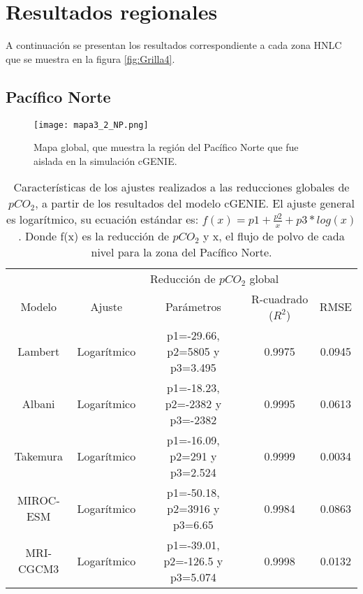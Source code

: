 \section{Resultados regionales}
A continuaci\'on se presentan los resultados correspondiente a cada zona HNLC que se muestra en la figura \ref{fig:Grilla4}.

\subsection{Pac\'ifico Norte}

\begin{figure}[H]
\centering
 \texttt{[image: mapa3\_2\_NP.png]}
 \caption[Figura región del Pacífico Norte]{Mapa global, que muestra la región del Pacífico Norte que fue aislada en la simulación cGENIE.}
  \label{fig:Mapa_NP}
\end{figure}

\begin{table}[H]
\centering
\begin{tabular}{|c|c|c|c|c|}
\hline
& \multicolumn{4}{c|}{Reducci\'on de $pCO_2$ global} \\
\cline{2-5}
Modelo& Ajuste & Par\'ametros & R-cuadrado ($R^2$) & RMSE\\
\hline \hline
Lambert  & Logar\'itmico  & p1=-29.66, p2=5805 y p3=3.495 & 0.9975 & 0.0945 \\ \hline
Albani & Logar\'itmico & p1=-18.23, p2=-2382 y p3=-2382 & 0.9995 & 0.0613\\ \hline
Takemura & Logar\'itmico & p1=-16.09, p2=291 y p3=2.524 & 0.9999 & 0.0034\\ \hline
MIROC-ESM & Logar\'itmico & p1=-50.18, p2=3916 y p3=6.65 & 0.9984 & 0.0863
\\ \hline
MRI-CGCM3 & Logar\'itmico & p1=-39.01, p2=-126.5 y p3=5.074 & 0.9998 & 0.0132\\ \hline
\end{tabular}
\caption[Coeficientes del ajuste NP]{Caracter\'isticas de los ajustes realizados a las reducciones globales de $pCO_2$, a partir de los resultados del modelo cGENIE. El ajuste general es logar\'itmico, 
su ecuaci\'on est\'andar es: $ f(x)=p1 + \frac{p2}{x} + p3*log(x)$. Donde f(x) es la reducci\'on de $pCO_2$ y x, el flujo de polvo de cada nivel para la zona del Pacífico Norte. } 
\label{tabla:NP}
\end{table} \newpage

